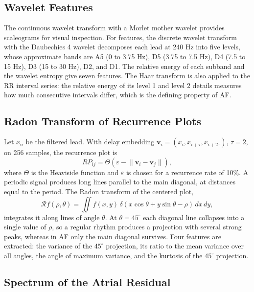 \documentclass[conference,a4paper]{IEEEtran}
\begin{document}
\subsection{Wavelet Features}

The continuous wavelet transform with a Morlet mother wavelet provides scaleograms for visual inspection. For features, the discrete wavelet transform with the Daubechies 4 wavelet decomposes each lead at 240 Hz into five levels, whose approximate bands are A5 (0 to 3.75 Hz), D5 (3.75 to 7.5 Hz), D4 (7.5 to 15 Hz), D3 (15 to 30 Hz), D2, and D1. The relative energy of each subband and the wavelet entropy give seven features. The Haar transform is also applied to the RR interval series: the relative energy of its level 1 and level 2 details measures how much consecutive intervals differ, which is the defining property of AF.

\subsection{Radon Transform of Recurrence Plots}

Let $x_n$ be the filtered lead. With delay embedding $\mathbf{v}_i = (x_i, x_{i+\tau}, x_{i+2\tau})$, $\tau = 2$, on 256 samples, the recurrence plot is
\begin{equation}
RP_{ij} = \Theta\left(\varepsilon - \lVert \mathbf{v}_i - \mathbf{v}_j \rVert\right),
\end{equation}
where $\Theta$ is the Heaviside function and $\varepsilon$ is chosen for a recurrence rate of 10\%. A periodic signal produces long lines parallel to the main diagonal, at distances equal to the period. The Radon transform of the centered plot,
\begin{equation}
\mathcal{R}f(\rho, \theta) = \iint f(x, y)\,\delta(x\cos\theta + y\sin\theta - \rho)\,dx\,dy,
\end{equation}
integrates it along lines of angle $\theta$. At $\theta = 45^\circ$ each diagonal line collapses into a single value of $\rho$, so a regular rhythm produces a projection with several strong peaks, whereas in AF only the main diagonal survives. Four features are extracted: the variance of the $45^\circ$ projection, its ratio to the mean variance over all angles, the angle of maximum variance, and the kurtosis of the $45^\circ$ projection.

\subsection{Spectrum of the Atrial Residual}
\end{document}
